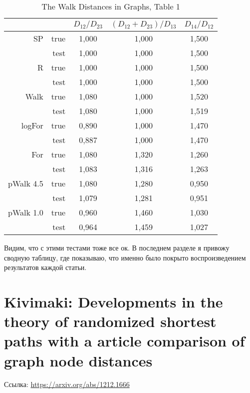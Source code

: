 \documentclass{article}
\begin{document}
\begin{table}[H]
\centering
\caption{The Walk Distances in Graphs, Table 1}
\label{my-label}
\begin{tabular}{rr|ccc}
          &      & $D_{12} / D_{23}$ & $(D_{12}+D_{23}) / D_{13}$ & $D_{14} / D_{12}$ \\
          \hline
SP        & true & 1,000       & 1,000               & 1,500       \\
          & test & 1,000       & 1,000               & 1,500       \\
          \cline{2-5}
R         & true & 1,000       & 1,000               & 1,500       \\
          & test & 1,000       & 1,000               & 1,500       \\
          \cline{2-5}
Walk      & true & 1,080       & 1,000               & 1,520       \\
          & test & 1,080       & 1,000               & 1,519       \\
          \cline{2-5}
logFor    & true & 0,890       & 1,000               & 1,470       \\
          & test & 0,887       & 1,000               & 1,470       \\
          \cline{2-5}
For       & true & 1,080       & 1,320               & 1,260       \\
          & test & 1,083       & 1,316               & 1,263       \\
          \cline{2-5}
pWalk 4.5 & true & 1,080       & 1,280               & 0,950       \\
          & test & 1,079       & 1,281               & 0,951       \\
          \cline{2-5}
pWalk 1.0 & true & 0,960       & 1,460               & 1,030       \\
          & test & 0,964       & 1,459               & 1,027      
\end{tabular}
\end{table}

Видим, что с этими тестами тоже все ок. В последнем разделе я привожу сводную таблицу, где показываю, что именно было покрыто воспроизведением результатов каждой статьи.


\section{Kivimaki: Developments in the theory of randomized shortest paths with a article comparison of graph node distances}
Ссылка: \url{https://arxiv.org/abs/1212.1666}
\end{document}
